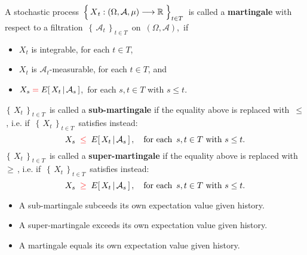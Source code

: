 \begin{definition}
\mbox{}
\vskip 0.1cm
\noindent
A stochastic process
\,$\left\{\,\overset{{\color{white}.}}{X}_{t} : (\Omega,\mathcal{A},\mu) \longrightarrow \Re \;\right\}_{t \in T}$\,
is called a \textbf{martingale}
with respect to a filtration
\,$\left\{\,\mathcal{A}_{t}\,\right\}_{t \in T}$\, on \,$(\Omega,\mathcal{A})$,\,
if
\begin{itemize}
\item
	$X_{t}$ is integrable, for each $t \in T$,
\item
	$X_{t}$ is $\mathcal{A}_{t}$-measurable, for each $t \in T$, and
\item
	$X_{s} \; {\color{red}=} \; E\!\left[\,X_{t}\,\vert\,\mathcal{A}_{s}\,\right]$,\,
	for each $s, t \in T$ with $s \leq t$.
\end{itemize}
$\left\{\,X_{t}\,\right\}_{t \in T}$\, is called a \textbf{{\color{red}sub-}martingale}
if the equality above is replaced with \,{\color{red}$\leq$}\,,
i.e. if \,$\left\{\,X_{t}\,\right\}_{t \in T}$\, satisfies instead:
\begin{equation*}
X_{s} \;\; {\color{red}\leq} \;\; E\!\left[\,X_{t}\,\vert\,\mathcal{A}_{s}\,\right],
\quad
\textnormal{for each \,$s, t \in T$ with $s \leq t$}.
\end{equation*}
\vskip 0.1cm
\noindent
$\left\{\,X_{t}\,\right\}_{t \in T}$\, is called a \textbf{{\color{red}super-}martingale}
if the equality above is replaced with \,{\color{red}$\geq$}\,,
i.e. if \,$\left\{\,X_{t}\,\right\}_{t \in T}$\, satisfies instead:
\begin{equation*}
X_{s} \;\; {\color{red}\geq} \;\; E\!\left[\,X_{t}\,\vert\,\mathcal{A}_{s}\,\right],
\quad
\textnormal{for each \,$s, t \in T$ with $s \leq t$}.
\end{equation*}
\end{definition}


\begin{remark}
\mbox{}
\vskip -0.1cm
\noindent
\begin{itemize}
\item
	A {\color{red}sub-}martingale {\color{red}sub}ceeds its own expectation value given history.
\item
	A super-martingale exceeds its own expectation value given history.
\item
	A martingale equals its own expectation value given history.
\end{itemize}
\end{remark}

